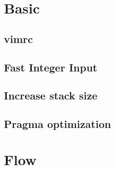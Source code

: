 \documentclass[a4paper,10pt,twocolumn,oneside]{article}
\begin{document}
\pagestyle{fancy}
\fancyfoot{}
\fancyhead[R]{\thepage}
\renewcommand{\headrulewidth}{0.4pt}
\renewcommand{\contentsname}{Contents} 

\scriptsize
\begingroup
\let\clearpage\relax
\tableofcontents
\endgroup
%
\section{Basic}
\subsection{vimrc}

% 
% 
\subsection{Fast Integer Input}

\subsection{Increase stack size}

\subsection{Pragma optimization}

% 
\section{Flow}
\end{document}
